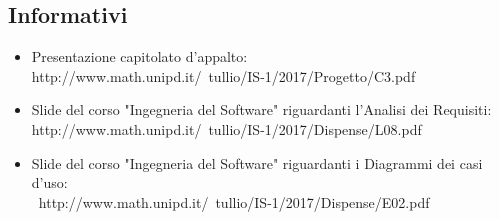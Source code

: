 \documentclass[./AnalisideiRequisiti.tex]{subfiles}
\begin{document}
\subsection{Informativi}
\begin{itemize}
	\item Presentazione capitolato d'appalto: \\ http://www.math.unipd.it/~tullio/IS-1/2017/Progetto/C3.pdf
	\item Slide del corso "Ingegneria del Software" riguardanti l'Analisi dei Requisiti: \\ http://www.math.unipd.it/~tullio/IS-1/2017/Dispense/L08.pdf
	\item Slide del corso "Ingegneria del Software" riguardanti i Diagrammi dei casi d'uso: \\\ http://www.math.unipd.it/~tullio/IS-1/2017/Dispense/E02.pdf
\end{itemize}
\end{document}
